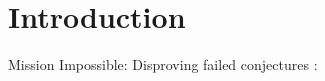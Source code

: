 \documentclass{report}
\begin{document}
    \part{Introduction}
    		Mission Impossible: Disproving failed conjectures :\
\end{document}
